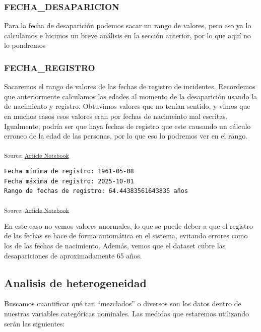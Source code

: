 \documentclass[
]{agujournal2019}
\begin{document}
\subsubsection{FECHA\_DESAPARICION}\label{fecha_desaparicion-1}

Para la fecha de desaparición podemos sacar un rango de valores, pero
eso ya lo calculamos e hicimos un breve análisis en la sección anterior,
por lo que aquí no lo pondremos

\subsubsection{FECHA\_REGISTRO}\label{fecha_registro}

Sacaremos el rango de valores de las fechas de registro de incidentes.
Recordemos que anteriormente calculamos las edades al momento de la
desaparición usando la de nacimiento y registro. Obtuvimos valores que
no tenían sentido, y vimos que en muchos casos esos valores eran por
fechas de nacimeinto mal escritas. Igualmente, podría ser que haya
fechas de registro que este causando un cálculo erroneo de la edad de
las personas, por lo que eso lo podremos ver en el rango.

\textsubscript{Source:
\href{https://Rou-uu.github.io/pruebaQuarto/index.qmd.html}{Article
Notebook}}

\begin{verbatim}
Fecha mínima de registro: 1961-05-08
Fecha máxima de registro: 2025-10-01
Rango de fechas de registro: 64.44383561643835 años
\end{verbatim}

\textsubscript{Source:
\href{https://Rou-uu.github.io/pruebaQuarto/index.qmd.html}{Article
Notebook}}

En este caso no vemos valores anormales, lo que se puede deber a que el
registro de las fechas se hace de forma automática en el sistema,
evitando errores como los de las fechas de nacimiento. Además, vemos que
el dataset cubre las desapariciones de aproximadamente 65 años.

\subsection{Analisis de
heterogeneidad}\label{analisis-de-heterogeneidad}

Buscamos cuantificar qué tan ``mezclados'' o diversos son los datos
dentro de nuestras variables categóricas nominales. Las medidas que
estaremos utilizando serán las siguientes:
\end{document}
